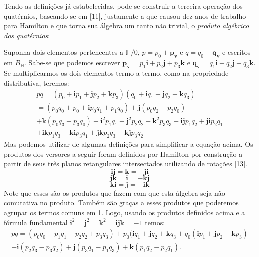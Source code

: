 \documentclass[a4paper,12pt]{article}
\begin{document}
	Tendo as definições já estabelecidas, pode-se construir a terceira operação dos quatérnios, baseando-se em [11], justamente a que causou dez anos de trabalho para Hamilton e que torna sua álgebra um tanto não trivial, o \textit{produto algébrico dos quatérnios}:
	
	Suponha dois elementos pertencentes a $\mathbb{H}/0$, $p = p_0 + \mathbf{p_v}$ e $q = q_0 + \mathbf{q_v}$ e escritos em $B_{\mathbb{H}}$. Sabe-se que podemos escrever $\mathbf{p_v} = p_1\mathbf{i} + p_2\mathbf{j} + p_3\mathbf{k}$ e $\mathbf{q_v} = q_1\mathbf{i} + q_2\mathbf{j} + q_3\mathbf{k}$. Se multiplicarmos os dois elementos termo a termo, como na propriedade distributiva, teremos:
	\begin{equation}
	\begin{aligned}
	pq = (p_0+\mathbf{i}p_1+\mathbf{j}p_2+\mathbf{k}p_3)(q_0+\mathbf{i}q_1+\mathbf{j}q_2+\mathbf{k}q_3) \\ = (p_0q_0+p_0+\mathbf{i}p_0q_1+p_1q_0)+\mathbf{j}(p_0q_2+p_2q_0) \\ +\mathbf{k}(p_0q_3+p_3q_0)+\mathbf{i}^2p_1q_1+\mathbf{j}^2p_2q_2+\mathbf{k}^2p_3q_3+\mathbf{ij}p_1q_2+\mathbf{ji}p_2q_1 \\ +\mathbf{ik}p_1q_3+\mathbf{ki}p_3q_1+\mathbf{jk}p_2q_3+\mathbf{kj}p_3q_2
	\end{aligned}		   	       
	\end{equation}
	Mas podemos utilizar de algumas definições para simplificar a equação acima. Os produtos dos versores a seguir foram definidos por Hamilton por construção a partir de seus três planos retangulares intersectados utilizando de rotações [13].
	\begin{equation*}
	\mathbf{ij} = \mathbf{k} = \mathbf{-ji}
	\end{equation*}
	\begin{equation*}
	\mathbf{jk} = \mathbf{i} = \mathbf{-kj}
	\end{equation*}
	\begin{equation*}
	\mathbf{ki} = \mathbf{j} = \mathbf{-ik}
	\end{equation*}
	Note que esses são os produtos que fazem com que esta álgebra seja não comutativa no produto. Também são graças a esses produtos que poderemos agrupar os termos comuns em 1. Logo, usando os produtos definidos acima e a fórmula fundamental $\mathbf{i}^2 = \mathbf{j}^2 = \mathbf{k}^2 = \mathbf{ijk} = -1$ temos:
	\begin{equation}
	\begin{aligned}
	pq = (p_0q_0-p_1q_1+p_2q_2+p_3q_3)+p_0(\mathbf{i}q_1+\mathbf{j}q_2+\mathbf{k}q_3+q_0(\mathbf{i}p_1+\mathbf{j}p_2+\mathbf{k}p_3) \\ +\mathbf{i}(p_2q_3-p_3q_2)+\mathbf{j}(p_3q_1-p_1q_3)+\mathbf{k}(p_1q_2-p_2q_1).
	\end{aligned}
	\end{equation}
\end{document}
